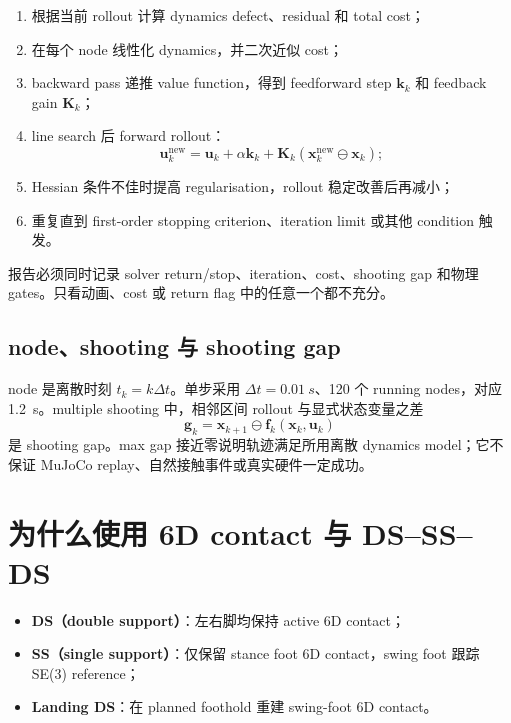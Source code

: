 \documentclass[UTF8,11pt,a4paper]{ctexart}
\begin{document}
\begin{enumerate}
 \item 根据当前 rollout 计算 dynamics defect、residual 和 total cost；
 \item 在每个 node 线性化 dynamics，并二次近似 cost；
 \item backward pass 递推 value function，得到 feedforward step $\bm k_k$ 和 feedback gain $\bm K_k$；
 \item line search 后 forward rollout：
 \begin{equation}
  \bm u_k^{\mathrm{new}}=\bm u_k+\alpha\bm k_k+
  \bm K_k(\bm x_k^{\mathrm{new}}\ominus\bm x_k);
 \end{equation}
 \item Hessian 条件不佳时提高 regularisation，rollout 稳定改善后再减小；
 \item 重复直到 first-order stopping criterion、iteration limit 或其他 condition 触发。
\end{enumerate}

报告必须同时记录 solver return/stop、iteration、cost、shooting gap 和物理 gates。只看动画、cost 或 return flag 中的任意一个都不充分。

\subsection{node、shooting 与 shooting gap}\label{sec:node}

node 是离散时刻 $t_k=k\Delta t$。单步采用 $\Delta t=\SI{0.01}{s}$、120 个 running nodes，对应 \SI{1.2}{s}。multiple shooting 中，相邻区间 rollout 与显式状态变量之差
\begin{equation}
 \bm g_k=\bm x_{k+1}\ominus\bm f_k(\bm x_k,\bm u_k)
\end{equation}
是 shooting gap。max gap 接近零说明轨迹满足所用离散 dynamics model；它不保证 MuJoCo replay、自然接触事件或真实硬件一定成功。

\section{为什么使用 6D contact 与 DS--SS--DS}\label{sec:contact}

\begin{itemize}
 \item \textbf{DS（double support）}：左右脚均保持 active 6D contact；
 \item \textbf{SS（single support）}：仅保留 stance foot 6D contact，swing foot 跟踪 SE(3) reference；
 \item \textbf{Landing DS}：在 planned foothold 重建 swing-foot 6D contact。
\end{itemize}
\end{document}
